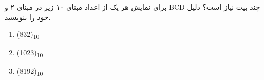 
برای نمایش هر یک از اعداد مبنای ۱۰ زیر در مبنای ۲ و BCD چند بیت نیاز است؟ دلیل خود را بنویسید.

\begin{latin}
	\begin{enumerate}
			\item 
			(832)\textsubscript{10}
			
			\item 
			(1023)\textsubscript{10}
			
			\item 
			(8192)\textsubscript{10}
		\end{enumerate}
\end{latin}
